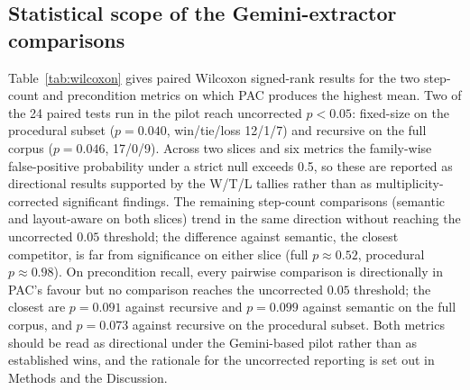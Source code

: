 \documentclass[fleqn,10pt]{wlscirep}
\begin{document}
\subsection*{Statistical scope of the Gemini-extractor comparisons}

Table~\ref{tab:wilcoxon} gives paired Wilcoxon signed-rank results for
the two step-count and precondition metrics on which PAC produces the
highest mean. Two of the 24 paired tests run in the pilot reach
uncorrected $p<0.05$: fixed-size on the procedural subset
($p=0.040$, win/tie/loss 12/1/7) and recursive on the full corpus
($p=0.046$, 17/0/9). Across two slices and six metrics the
family-wise false-positive probability under a strict null exceeds
0.5, so these are reported as directional results supported by the
W/T/L tallies rather than as multiplicity-corrected significant
findings. The remaining step-count comparisons (semantic and
layout-aware on both slices) trend in the same direction without
reaching the uncorrected $0.05$ threshold; the difference against
semantic, the closest competitor, is far from significance on either
slice (full $p\approx0.52$, procedural $p\approx0.98$). On
precondition recall, every pairwise comparison is directionally in
PAC's favour but no comparison reaches the uncorrected $0.05$
threshold; the closest are $p=0.091$ against recursive and $p=0.099$
against semantic on the full corpus, and $p=0.073$ against recursive
on the procedural subset. Both metrics should be read as
directional under the Gemini-based pilot rather than as established
wins, and the rationale for the uncorrected reporting is set out in
Methods and the Discussion.
\end{document}
